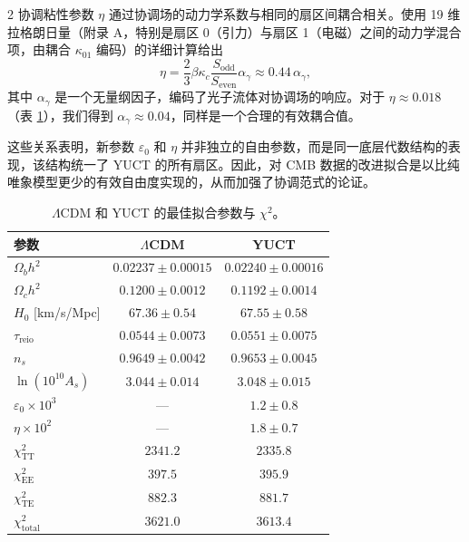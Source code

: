 \documentclass[11pt,a4paper]{article}
\begin{document}
\begin{multicols}{2}
		协调粘性参数 $\eta$ 通过协调场的动力学系数与相同的扇区间耦合相关。使用 19 维拉格朗日量（附录 A，特别是扇区 0（引力）与扇区 1（电磁）之间的动力学混合项，由耦合 $\kappa_{01}$ 编码）的详细计算给出
		\begin{equation}
			\eta = \frac{2}{3} \beta \kappa_c \frac{S_{\mathrm{odd}}}{S_{\mathrm{even}}} \alpha_\gamma \approx 0.44 \, \alpha_\gamma,
		\end{equation}
		其中 $\alpha_\gamma$ 是一个无量纲因子，编码了光子流体对协调场的响应。对于 $\eta \approx 0.018$（表 \ref{tab:results}），我们得到 $\alpha_\gamma \approx 0.04$，同样是一个合理的有效耦合值。
		
		这些关系表明，新参数 $\varepsilon_0$ 和 $\eta$ 并非独立的自由参数，而是同一底层代数结构的表现，该结构统一了 YUCT 的所有扇区。因此，对 CMB 数据的改进拟合是以比纯唯象模型更少的有效自由度实现的，从而加强了协调范式的论证。
		
	\end{multicols}
	
	\begin{table}[H]
		\centering
		\caption{$\Lambda$CDM 和 YUCT 的最佳拟合参数与 $\chi^2$。}
		\label{tab:results}
		\LARGE
		\begin{tabular}{lcc}
			\toprule
			参数 & $\Lambda$CDM & YUCT \\
			\midrule
			$\Omega_b h^2$ & $0.02237 \pm 0.00015$ & $0.02240 \pm 0.00016$ \\
			$\Omega_c h^2$ & $0.1200 \pm 0.0012$ & $0.1192 \pm 0.0014$ \\
			$H_0$ [km/s/Mpc] & $67.36 \pm 0.54$ & $67.55 \pm 0.58$ \\
			$\tau_{\mathrm{reio}}$ & $0.0544 \pm 0.0073$ & $0.0551 \pm 0.0075$ \\
			$n_s$ & $0.9649 \pm 0.0042$ & $0.9653 \pm 0.0045$ \\
			$\ln(10^{10}A_s)$ & $3.044 \pm 0.014$ & $3.048 \pm 0.015$ \\
			$\varepsilon_0 \times 10^3$ & — & $1.2 \pm 0.8$ \\
			$\eta \times 10^2$ & — & $1.8 \pm 0.7$ \\
			\midrule
			$\chi^2_{\mathrm{TT}}$ & $2341.2$ & $2335.8$ \\
			$\chi^2_{\mathrm{EE}}$ & $397.5$ & $395.9$ \\
			$\chi^2_{\mathrm{TE}}$ & $882.3$ & $881.7$ \\
			$\chi^2_{\mathrm{total}}$ & $3621.0$ & $3613.4$ \\
			\bottomrule
		\end{tabular}
	\end{table}
	
\end{document}
